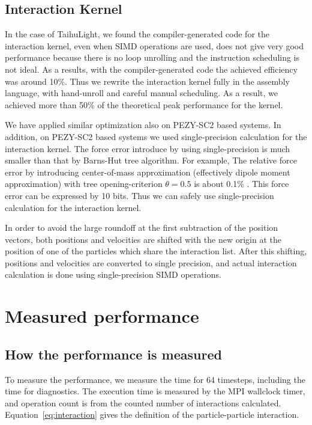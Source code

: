 \documentclass[Afour,sageh,times]{sagej}
\newcommand{\rev}[1]{{#1}}
\begin{document}
\subsection{Interaction Kernel}

In the case of TaihuLight, we found the compiler-generated code for
the interaction kernel, even when SIMD operations are used, does not
give very good performance \rev{because there is no loop unrolling and
  the instruction scheduling is not ideal. As a results, with the
  compiler-generated code the achieved efficiency was around 10\%.}
Thus we rewrite the interaction kernel fully in the assembly language,
with hand-unroll and careful manual scheduling. As a result, we
achieved more than 50\% of the theoretical peak performance for the
kernel.

We have applied similar optimization also on PEZY-SC2 based
systems. In addition, on PEZY-SC2 based systems we used
single-precision calculation for the interaction kernel. \rev{ The
  force error introduce by using single-precision is much smaller than
  that by Barns-Hut tree algorithm. For example, The relative force
  error by introducing center-of-mass approximation (effectively
  dipole moment approximation) with tree opening-criterion
  $\theta=0.5$ is about 0.1\% \citep{McMillanAarseth1993}. This force
  error can be expressed by 10 bits. Thus we can safely use
  single-precision calculation for the interaction kernel.}

In order to avoid the large roundoff at the first subtraction of the
position vectors, both positions and velocities are shifted with the
new origin at the position of one of the particles which share the
interaction list.  After this shifting, positions and velocities are
converted to single precision, and actual interaction calculation is
done using single-precision SIMD operations.


\section{Measured performance}
\label{sect:performance}
\subsection{How the performance is measured}

To measure the performance, we measure the time for 64 timesteps,
including the time for diagnostics.  The execution time is measured by
the MPI wallclock timer, and operation count is from the counted
number of interactions calculated. Equation~\ref{eq:interaction} gives
the definition of the particle-particle interaction.
\end{document}
